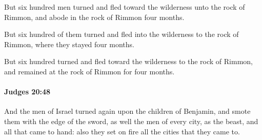 			\begin{versebox}
					\item[BHS] 
					\item[ASV] But six hundred men turned and fled toward the wilderness unto the rock of Rimmon, and abode in the rock of Rimmon four months.
					\item[NIV] But six hundred of them turned and fled into the wilderness to the rock of Rimmon, where they stayed four months.
					\item[NRSV] But six hundred turned and fled toward the wilderness to the rock of Rimmon, and remained at the rock of Rimmon for four months.
			\end{versebox}

		\paragraph{Judges 20:48} %
			\label{JUDGES-20-48}

			And the men of Israel turned again upon the children of Benjamin, and smote them with the edge of the sword, as well the men of every city, as the beast, and all that came to hand: also they set on fire all the cities that they came to.

